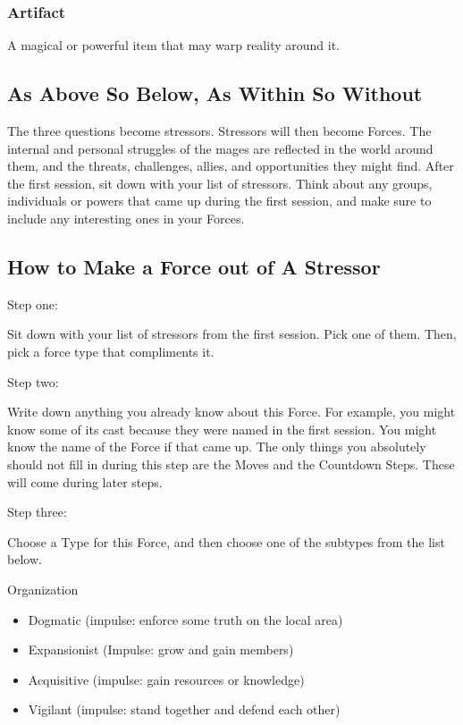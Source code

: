 \documentclass[
]{article}
\begin{document}
\hypertarget{artifact}{%
\subsubsection{Artifact}\label{artifact}}

A magical or powerful item that may warp reality around it.

\hypertarget{as-above-so-below-as-within-so-without}{%
\subsection{As Above So Below, As Within So
Without}\label{as-above-so-below-as-within-so-without}}

The three questions become stressors. Stressors will then become Forces.
The internal and personal struggles of the mages are reflected in the
world around them, and the threats, challenges, allies, and
opportunities they might find. After the first session, sit down with
your list of stressors. Think about any groups, individuals or powers
that came up during the first session, and make sure to include any
interesting ones in your Forces.

\hypertarget{how-to-make-a-force-out-of-a-stressor}{%
\subsection{How to Make a Force out of A
Stressor}\label{how-to-make-a-force-out-of-a-stressor}}

Step one:

Sit down with your list of stressors from the first session. Pick one of
them. Then, pick a force type that compliments it.

Step two:

Write down anything you already know about this Force. For example, you
might know some of its cast because they were named in the first
session. You might know the name of the Force if that came up. The only
things you absolutely should not fill in during this step are the Moves
and the Countdown Steps. These will come during later steps.

Step three:

Choose a Type for this Force, and then choose one of the subtypes from
the list below.

Organization

\begin{itemize}
\item
  Dogmatic (impulse: enforce some truth on the local area)
\item
  Expansionist (Impulse: grow and gain members)
\item
  Acquisitive (impulse: gain resources or knowledge)
\item
  Vigilant (impulse: stand together and defend each other)
\end{itemize}
\end{document}
